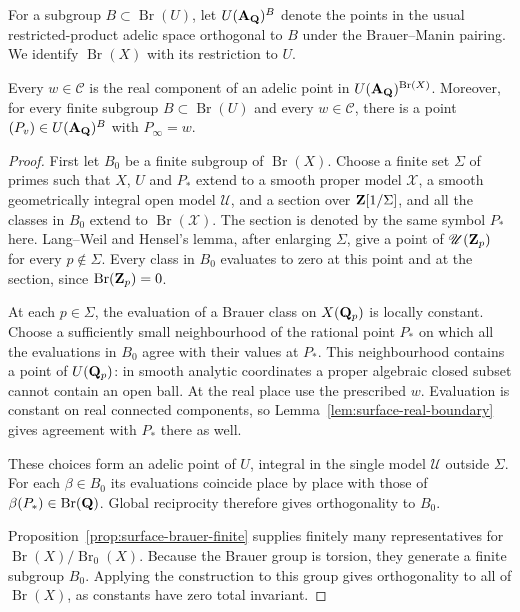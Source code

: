 For a subgroup $B\subset\operatorname{Br}(U)$, let
$U(\mathbf A_\mathbf Q)^B$ denote the points in the usual restricted-product
adelic space orthogonal to $B$ under the Brauer--Manin pairing.  We
identify $\operatorname{Br}(X)$ with its restriction to $U$.

\begin{theorem}\label{thm:surface-brauer-projection}
Every $w\in\mathcal C$ is the real component of an adelic point in
$U(\mathbf A_\mathbf Q)^{\operatorname{Br}(X)}$.  Moreover, for every finite
subgroup $B\subset\operatorname{Br}(U)$ and every $w\in\mathcal C$,
there is a point $(P_v)\in U(\mathbf A_\mathbf Q)^B$ with $P_\infty=w$.
\end{theorem}

\begin{proof}
First let $B_0$ be a finite subgroup of $\operatorname{Br}(X)$.
Choose a finite set $\Sigma$ of primes such that $X$, $U$ and
$P_*$ extend to a smooth proper model $\mathscr X$, a smooth
geometrically integral open model $\mathscr U$, and a section over
$\mathbf Z[1/\Sigma]$, and all the classes in $B_0$ extend to
$\operatorname{Br}(\mathscr X)$.  The section is denoted by the same
symbol $P_*$ here.  Lang--Weil and Hensel's lemma, after enlarging
$\Sigma$, give a point of $\mathscr U(\mathbf Z_p)$ for every
$p\notin\Sigma$.  Every class in $B_0$ evaluates to zero at this
point and at the section, since $\operatorname{Br}(\mathbf Z_p)=0$.

At each $p\in\Sigma$, the evaluation of a Brauer class on $X(\mathbf Q_p)$
is locally constant.  Choose a sufficiently small neighbourhood of
the rational point $P_*$ on which all the evaluations in $B_0$
agree with their values at $P_*$.  This neighbourhood contains a
point of $U(\mathbf Q_p)$: in smooth analytic coordinates a proper algebraic
closed subset cannot contain an open ball.  At the real place use
the prescribed $w$.  Evaluation is constant on real connected
components, so Lemma~\ref{lem:surface-real-boundary} gives agreement
with $P_*$ there as well.

These choices form an adelic point of $U$, integral in the single
model $\mathscr U$ outside $\Sigma$.  For each $\beta\in B_0$ its
evaluations coincide place by place with those of
$\beta(P_*)\in\operatorname{Br}(\mathbf Q)$.  Global reciprocity
therefore gives orthogonality to $B_0$.

Proposition~\ref{prop:surface-brauer-finite} supplies finitely many
representatives for
$\operatorname{Br}(X)/\operatorname{Br}_0(X)$.  Because the Brauer
group is torsion, they generate a finite subgroup $B_0$.  Applying
the construction to this group gives orthogonality to all of
$\operatorname{Br}(X)$, as constants have zero total invariant.


\end{proof}
